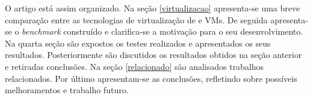 O artigo está assim organizado. Na seção \ref{virtualizacao} apresenta-se uma breve comparação entre as tecnologias de virtualização de {\conts} e VMs. De seguida apresenta-se o \textit{benchmark} construído e clarifica-se a motivação para o seu desenvolvimento. Na quarta seção são expostos os testes realizados e apresentados os seus resultados. Posteriormente são discutidos os resultados obtidos na seção anterior e retiradas conclusões. Na seção \ref{relacionado} são analisados trabalhos relacionados. Por último apresentam-se as conclusões, 
refletindo sobre  possíveis melhoramentos e trabalho futuro.










